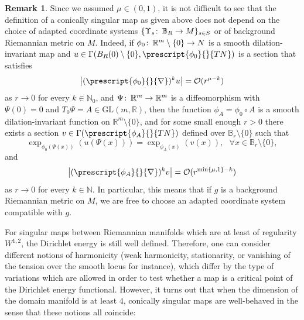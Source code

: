 \documentclass{article}
\numberwithin{equation}{section}        %
\theoremstyle{bfnote}
\theoremstyle{definition}
\theoremstyle{bfremark}
\newtheorem{rem}[thm]{Remark}               %
\newcommand{\col}{\colon \thinspace}        %
\newcommand{\R}{\mathbb{R}}                 %
\newcommand{\Ball}{\mathbb{B}}              %
\begin{document}
\begin{rem}     \label{rem: independence of conically singular from choice of framing}
    Since we assumed $\mu \in (0,1)$, it is not difficult to see that the definition of a conically singular map as given above does not depend on the choice of adapted coordinate systems $\{\Upsilon_s \col \Ball_R \to M\}_{s\in S}$ or of background Riemannian metric on $M$. Indeed, if $\phi_0 \col \R^m \setminus \{0\} \to N$ is a smooth dilation-invariant map and $u \in \Gamma(B_R(0) \setminus \{0\}, \prescript{\phi_0}{}{TN})$ is a section that satisfies 
    \begin{equation*}
        \big\vert (\prescript{\phi_0}{}{\nabla})^k u \big\vert = \mathcal{O}(r^{\mu-k}) 
    \end{equation*}
    as $r\to 0$ for every $k \in \mathbb{N}_0$, and $\Psi \col \R^m \to \R^m$ is a diffeomorphism with $\Psi(0) = 0$ and $T_0 \Psi = A \in \mathrm{GL}(m,\R)$, then the function $\phi_A = \phi_0 \circ A$ is a smooth dilation-invariant function on $\R^m \setminus \{0\}$, and for some small enough $r > 0$ there exists a section $v\in \Gamma(\prescript{\phi_A}{}{TN})$ defined over $\Ball_r \setminus \{0\}$ such that
    \begin{equation*}
        \exp_{\phi_0(\Psi(x))} (u(\Psi(x))) = \exp_{\phi_A(x)}(v(x)), ~~~ \forall x \in \Ball_r \setminus \{0\},
    \end{equation*}
    and
    \begin{equation*}
        \big\vert (\prescript{\phi_A}{}{\nabla})^k v \big\vert = \mathcal{O}(r^{\min\{\mu,1\}-k})
    \end{equation*}
    as $r\to 0$ for every $k \in \mathbb{N}$. In particular, this means that if $g$ is a background Riemannian metric on $M$, we are free to choose an adapted coordinate system compatible with $g$.
\end{rem}

For singular maps between Riemannian manifolds which are at least of regularity $W^{1,2}$, the Dirichlet energy is still well defined. Therefore, one can consider different notions of harmonicity (weak harmonicity, stationarity, or vanishing of the tension over the smooth locus for instance), which differ by the type of variations which are allowed in order to test whether a map is a critical point of the Dirichlet energy functional. However, it turns out that when the dimension of the domain manifold is at least $4$, conically singular maps are well-behaved in the sense that these notions all coincide:
\end{document}
